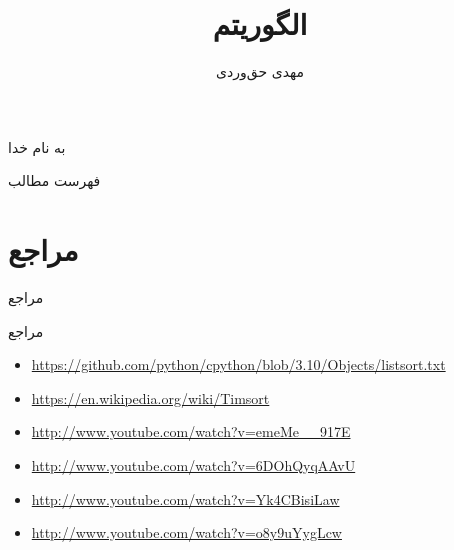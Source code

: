 \documentclass[aspectratio=169, dvipsnames, svgnames, x11names]{beamer}
\title{الگوریتم \lr{Timsort}}
\author{
مهدی حق‌وردی
}
\institute{
\\
\texttt{[image: logos/ui.png]}}
\date{}
\begin{document}
\begin{frame}[plain]
\begin{center}
به نام خدا
\end{center}

\maketitle

\end{frame}

\setcounter{framenumber}{0}
\raggedleft

\begin{frame}{فهرست مطالب}
\begin{flushright}
\tableofcontents
\end{flushright}
\end{frame}










\section{مراجع}
\begin{frame}{مراجع}
\begin{latin}


\end{latin}
\end{frame}

\begin{frame}{مراجع}
\begin{latin}
\begin{itemize}
\item \url{https://github.com/python/cpython/blob/3.10/Objects/listsort.txt}
\item \url{https://en.wikipedia.org/wiki/Timsort}
\item \url{http://www.youtube.com/watch?v=emeMe__917E}
\item \url{http://www.youtube.com/watch?v=6DOhQyqAAvU}
\item \url{http://www.youtube.com/watch?v=Yk4CBisiLaw}
\item \url{http://www.youtube.com/watch?v=o8y9uYygLcw}
\end{itemize}
\end{latin}
\end{frame}
\end{document}
